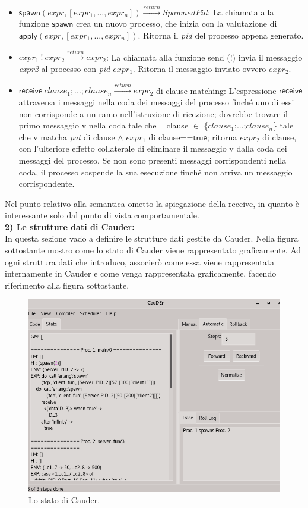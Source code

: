 \documentclass[background.tex]{subfiles}
\begin{document}
\begin{itemize}
	\item $\displaystyle \mathsf{spawn}(expr,[expr_{1},...,expr_{n}])\xrightarrow{return}SpawnedPid$: La chiamata alla funzione $\mathsf{spawn}$ crea un nuovo processo, che inizia con la valutazione di $\displaystyle \mathsf{apply}(expr,[expr_{1},...,expr_{n}])$. Ritorna il \textit{pid} del processo appena generato.
	\item $\displaystyle expr_{1}~!~expr_{2}\xrightarrow{return}expr_{2}$: La chiamata alla funzione send (!) invia il messaggio \textit{expr2} al processo con \textit{pid $expr_{1}$}. Ritorna il messaggio inviato ovvero \textit{$expr_{2}$}.
	\item $\displaystyle \mathsf{receive}~clause_{1};...;clause_{n}\xrightarrow{return}expr_{2}$ di clause matching: L'espressione $\mathsf{receive}$ attraversa i messaggi nella coda dei messaggi del processo finché uno di essi non corrisponde a un ramo nell'istruzione di ricezione; dovrebbe trovare il primo messaggio v nella coda tale che $\exists$ clause $\in$ \{$clause_{1}$;...;$clause_{n}$\} tale che v matcha \textit{pat} di clause $\wedge$ \textit{$expr_{1}$} di clause==$\mathsf{true}$; ritorna \textit{$expr_{2}$} di clause, con l'ulteriore effetto collaterale di eliminare il messaggio v dalla coda dei messaggi del processo. Se non sono presenti messaggi corrispondenti nella coda, il processo sospende la sua esecuzione finché non arriva un messaggio corrispondente.
\end{itemize}
Nel punto relativo alla semantica ometto la spiegazione della receive, in quanto è interessante solo dal punto di vista comportamentale.\\
\textbf{2) Le strutture dati di Cauder:}\\
In questa sezione vado a definire le strutture dati gestite da Cauder.
Nella figura sottostante mostro come lo stato di Cauder viene rappresentato graficamente.
Ad ogni struttura dati che introduco, associerò come essa viene rappresentata internamente in Cauder e come venga rappresentata graficamente, facendo riferimento alla figura sottostante.
\begin{figure}[H]
	\centerline{\includegraphics[scale=0.5]{./Background/Cauder/Imgs/CauderStato}}
	\caption{Lo stato di Cauder.}
	\label{fig3}
\end{figure}
\end{document}
